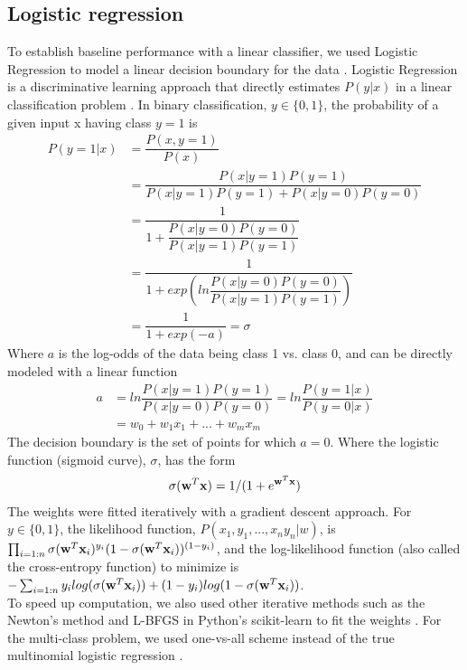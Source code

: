 \documentclass[conference]{IEEEtran}
\begin{document}
\subsection{Logistic regression}
To establish baseline performance with a linear classifier, we used Logistic Regression to model a linear decision boundary for the data \cite{bishop2006pattern,hastie2009elements}. Logistic Regression is a discriminative learning approach that directly estimates $P(y|x)$ in a linear classification problem \cite{Ng02ondiscriminative}. In binary classification, $y \in \{0,1\}$, the probability of a given input x having class $y=1$ is
\begin{align*}
P(y=1|x) &= \dfrac{P(x,y=1)}{P(x)} \\
&= \dfrac{P(x|y=1) P(y=1)}{P(x|y=1)P(y=1)+P(x|y=0)P(y=0)} \\
&= \dfrac{1}{1+ \dfrac{P(x|y=0)P(y=0)}{P(x|y=1)P(y=1)}} \\
&= \dfrac{1}{1+ exp(ln\dfrac{P(x|y=0)P(y=0)}{P(x|y=1)P(y=1)})} \\
&= \dfrac{1}{1+exp(-a)} = \sigma
\end{align*}
Where $a$ is the log-odds of the data being class 1 vs. class 0, and can be directly modeled with a linear function
\begin{align*}
a &= ln\dfrac{P(x|y=1)P(y=1)}{P(x|y=0)P(y=0)} = ln\dfrac{P(y=1|x)}{P(y=0|x)} \\
&= w_0+w_1x_1+...+w_mx_m
\end{align*}
The decision boundary is the set of points for which $a=0$.
Where the logistic function (sigmoid curve), $\sigma$, has the form
\begin{align*}
\sigma (\bold{w}^T \bold{x}) = 1 / (1 + e^{\bold{w}^T\bold{x}})
\end{align*}
The weights were fitted iteratively with a gradient descent approach. For $y \in \{0,1\}$, the likelihood function, $P(x_1,y_1,...,x_ny_n|w)$, is $\prod_{i=1:n} \sigma (\bold{w}^T \bold{x}_i)^{y_i} (1-\sigma (\bold{w}^T \bold{x}_i))^{(1-y_i)}$, and the log-likelihood function (also called the cross-entropy function) to minimize is $- \sum_{i=1:n} y_i log(\sigma (\bold{w}^T \bold{x}_i)) + (1-y_i)log(1-\sigma (\bold{w}^T \bold{x}_i))$.\\
To speed up computation, we also used other iterative methods such as the Newton's method and L-BFGS in Python's scikit-learn to fit the weights \cite{scikit-learn}.
For the multi-class problem, we used one-vs-all scheme instead of the true multinomial logistic regression \cite{bishop2006pattern}. 
\end{document}
